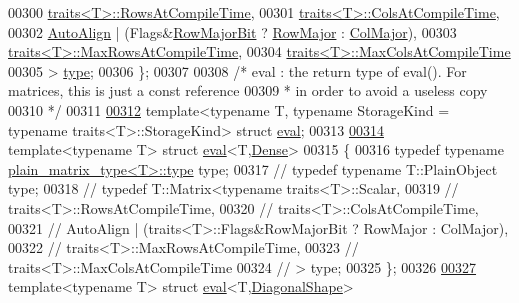 \begin{DoxyCode}
{00300                 \hyperlink{struct_eigen_1_1internal_1_1traits}{traits<T>::RowsAtCompileTime},
00301                 \hyperlink{struct_eigen_1_1internal_1_1traits}{traits<T>::ColsAtCompileTime},
00302                 \hyperlink{group__enums_ggaacded1a18ae58b0f554751f6cdf9eb13a28d63c0dd8560827162decfd898804f4}{AutoAlign} | (Flags&\hyperlink{group__flags_gae4f56c2a60bbe4bd2e44c5b19cbe8762}{RowMajorBit} ? \hyperlink{group__enums_ggaacded1a18ae58b0f554751f6cdf9eb13acfcde9cd8677c5f7caf6bd603666aae3}{RowMajor} : 
      \hyperlink{group__enums_ggaacded1a18ae58b0f554751f6cdf9eb13a0cbd4bdd0abcfc0224c5fcb5e4f6669a}{ColMajor}),
00303                 \hyperlink{struct_eigen_1_1internal_1_1traits}{traits<T>::MaxRowsAtCompileTime},
00304                 \hyperlink{struct_eigen_1_1internal_1_1traits}{traits<T>::MaxColsAtCompileTime}
00305           > \hyperlink{group___core___module_class_eigen_1_1_array}{type};
00306 \};
00307 
00308 \textcolor{comment}{/* eval : the return type of eval(). For matrices, this is just a const reference}
00309 \textcolor{comment}{ * in order to avoid a useless copy}
00310 \textcolor{comment}{ */}
00311 
\hyperlink{struct_eigen_1_1internal_1_1eval}{00312} template<typename T, typename StorageKind = typename traits<T>::StorageKind> \textcolor{keyword}{struct }
      \hyperlink{struct_eigen_1_1internal_1_1eval}{eval};
00313 
\hyperlink{struct_eigen_1_1internal_1_1eval_3_01_t_00_01_dense_01_4}{00314} \textcolor{keyword}{template}<\textcolor{keyword}{typename} T> \textcolor{keyword}{struct }\hyperlink{struct_eigen_1_1internal_1_1eval}{eval}<T,\hyperlink{struct_eigen_1_1_dense}{Dense}>
00315 \{
00316   \textcolor{keyword}{typedef} \textcolor{keyword}{typename} \hyperlink{struct_eigen_1_1internal_1_1plain__matrix__type}{plain\_matrix\_type<T>::type} type;
00317 \textcolor{comment}{//   typedef typename T::PlainObject type;}
00318 \textcolor{comment}{//   typedef T::Matrix<typename traits<T>::Scalar,}
00319 \textcolor{comment}{//                 traits<T>::RowsAtCompileTime,}
00320 \textcolor{comment}{//                 traits<T>::ColsAtCompileTime,}
00321 \textcolor{comment}{//                 AutoAlign | (traits<T>::Flags&RowMajorBit ? RowMajor : ColMajor),}
00322 \textcolor{comment}{//                 traits<T>::MaxRowsAtCompileTime,}
00323 \textcolor{comment}{//                 traits<T>::MaxColsAtCompileTime}
00324 \textcolor{comment}{//           > type;}
00325 \};
00326 
\hyperlink{struct_eigen_1_1internal_1_1eval_3_01_t_00_01_diagonal_shape_01_4}{00327} \textcolor{keyword}{template}<\textcolor{keyword}{typename} T> \textcolor{keyword}{struct }\hyperlink{struct_eigen_1_1internal_1_1eval}{eval}<T,\hyperlink{struct_eigen_1_1_diagonal_shape}{DiagonalShape}>
}
\end{DoxyCode}
